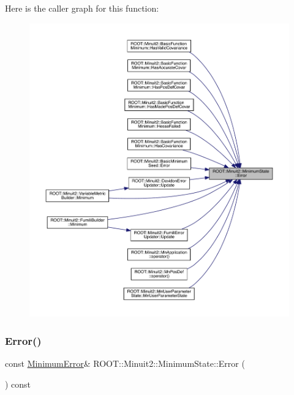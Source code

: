 Here is the caller graph for this function\+:
\nopagebreak
\begin{figure}[H]
\begin{center}
\leavevmode
\includegraphics[width=350pt]{db/dcd/classROOT_1_1Minuit2_1_1MinimumState_a28d9bb6148e54a7bf4ca15ca9548fe23_icgraph}
\end{center}
\end{figure}
\mbox{\label{classROOT_1_1Minuit2_1_1MinimumState_a28d9bb6148e54a7bf4ca15ca9548fe23}} 
\subsubsection{\texorpdfstring{Error()}{Error()}\hspace{0.1cm}{\footnotesize\ttfamily [3/3]}}
{\footnotesize\ttfamily const \mbox{\hyperlink{classROOT_1_1Minuit2_1_1MinimumError}{Minimum\+Error}}\& R\+O\+O\+T\+::\+Minuit2\+::\+Minimum\+State\+::\+Error (\begin{DoxyParamCaption}{ }\end{DoxyParamCaption}) const\hspace{0.3cm}{\ttfamily [inline]}}

